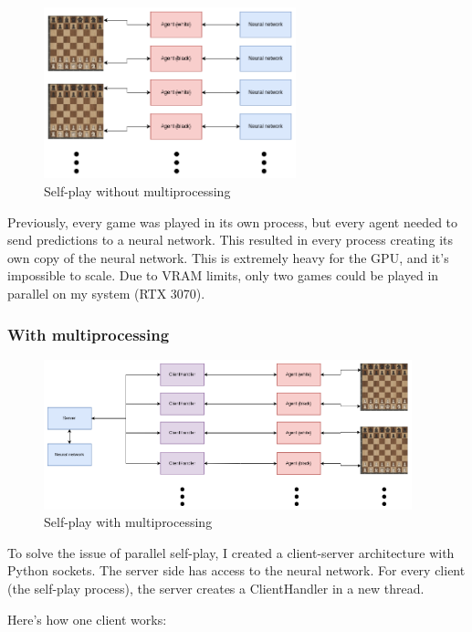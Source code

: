 \documentclass{article}
\begin{document}
\begin{figure}[H]
    \centering
    \includegraphics[width=0.65\textwidth]{img/without-multiprocessing.png}
    \caption{Self-play without multiprocessing}
\end{figure}

Previously, every game was played in its own process, but every agent needed to send predictions to a neural network.
This resulted in every process creating its own copy of the neural network. This is extremely heavy for the GPU, and
it's impossible to scale. Due to VRAM limits, only two games could be played in parallel on my system (RTX 3070).

\subsubsection{With multiprocessing}

\begin{figure}[H]
    \centering
    \includegraphics[width=0.95\textwidth]{img/with-multiprocessing.png}
    \caption{Self-play with multiprocessing}
\end{figure}

To solve the issue of parallel self-play, I created a client-server architecture with Python sockets.
The server side has access to the neural network. For every client (the self-play process), 
the server creates a ClientHandler in a new thread.

Here's how one client works:
\end{document}
